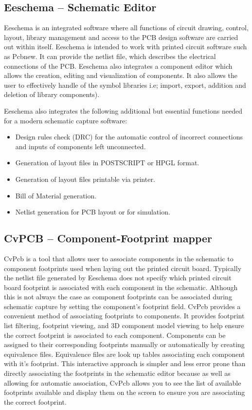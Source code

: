 \subsection {Eeschema -- Schematic Editor}
Eeschema is an integrated software where all functions of circuit drawing, control, layout, library management and access to the PCB design software are carried out within itself. Eeschema is intended to work with printed circuit software such as Pcbnew. It can provide the netlist file, which describes the electrical connections of the PCB. Eeschema also integrates a component editor which allows the creation, editing and visualization of components. It also allows the user to effectively handle of the symbol libraries i.e; import, export, addition and deletion of library components).

Eeschema also integrates the following additional but essential functions needed for a modern schematic capture software:
\begin{itemize}
\item Design rules check (DRC) for the automatic control of incorrect connections and inputs of components left unconnected.
\item Generation of layout files in POSTSCRIPT or HPGL format.
\item Generation of layout files printable via printer.
\item Bill of Material generation.
\item Netlist generation for PCB layout or for simulation.
\end{itemize}

\subsection {CvPCB -- Component-Footprint mapper}
CvPcb is a tool that allows user to associate components in the schematic to component footprints used when laying out the printed circuit board. Typically the netlist file generated by Eeschema does not specify which printed circuit board footprint is associated with each component in the schematic. Although this is not always the case as component footprints can be associated during schematic capture by setting the component's footprint field. CvPcb provides a convenient method of associating footprints to components. It provides footprint list filtering, footprint viewing, and 3D component model viewing to help ensure the correct footprint is associated to each component. Components can be assigned to their corresponding footprints manually or automatically by creating equivalence files. Equivalence files are look up tables associating each component with it's footprint. This interactive approach is simpler and less error prone than directly associating the footprints in the schematic editor because as well as allowing for automatic association, CvPcb allows you to see the list of available footprints available and display them on the screen to ensure you are associating the correct footprint.

